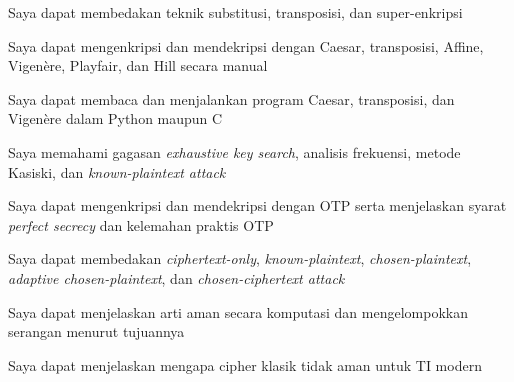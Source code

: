 \documentclass[main.tex]{subfiles}
\begin{document}
\begin{checklist}
  \item Saya dapat membedakan teknik substitusi, transposisi, dan super-enkripsi
  \item Saya dapat mengenkripsi dan mendekripsi dengan Caesar, transposisi, Affine, Vigen\`{e}re, Playfair, dan Hill secara manual
  \item Saya dapat membaca dan menjalankan program Caesar, transposisi, dan Vigen\`{e}re dalam Python maupun C
  \item Saya memahami gagasan \textit{exhaustive key search}, analisis frekuensi, metode Kasiski, dan \textit{known-plaintext attack}
  \item Saya dapat mengenkripsi dan mendekripsi dengan OTP serta menjelaskan syarat \textit{perfect secrecy} dan kelemahan praktis OTP
  \item Saya dapat membedakan \textit{ciphertext-only}, \textit{known-plaintext}, \textit{chosen-plaintext}, \textit{adaptive chosen-plaintext}, dan \textit{chosen-ciphertext attack}
  \item Saya dapat menjelaskan arti aman secara komputasi dan mengelompokkan serangan menurut tujuannya
  \item Saya dapat menjelaskan mengapa cipher klasik tidak aman untuk TI modern
\end{checklist}

\end{document}
